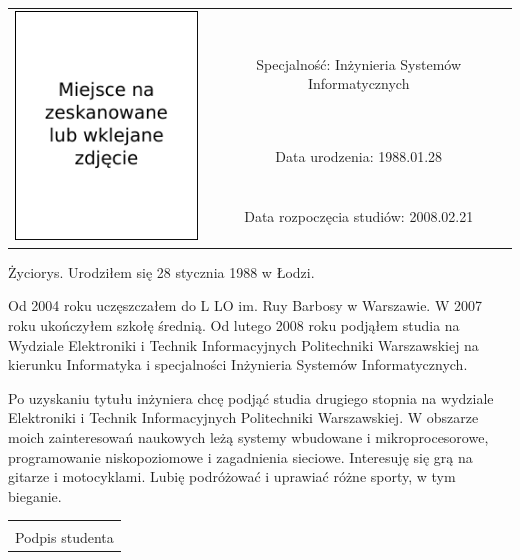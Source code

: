 \thispagestyle{empty}

\begin{tabular}{@{}c c}
  \multirow{4}{*}{\includegraphics{img/zdjecie.pdf}} & \\
  & Specjalność: \hfill Inżynieria Systemów Informatycznych \\
\addlinespace[24pt]
  & Data urodzenia: \hfill 1988.01.28 \\ \addlinespace[24pt]
  & Data rozpoczęcia studiów: \hfill 2008.02.21
\end{tabular}

\vspace{48pt}

Życiorys.
\vfill
Urodziłem się 28 stycznia 1988 w Łodzi. 

Od 2004 roku uczęszczałem do L LO im. Ruy Barbosy w Warszawie. W 2007 roku ukończyłem szkołę średnią. Od lutego 2008 roku podjąłem studia na Wydziale Elektroniki i Technik Informacyjnych Politechniki Warszawskiej na kierunku Informatyka i specjalności Inżynieria Systemów Informatycznych.

Po uzyskaniu tytułu inżyniera chcę podjąć studia drugiego stopnia na wydziale Elektroniki i Technik Informacyjnych Politechniki Warszawskiej. W obszarze moich zainteresowań naukowych leżą systemy wbudowane i mikroprocesorowe, programowanie niskopoziomowe i zagadnienia sieciowe. Interesuję się grą na gitarze i motocyklami. Lubię podróżować i uprawiać różne sporty, w tym bieganie. 

\vspace{24pt}

\begin{flushright}
 \begin{tabular}{>{\centering}m{}@{}}
  \dotfill \\
  Podpis studenta
 \end{tabular}
\end{flushright}

